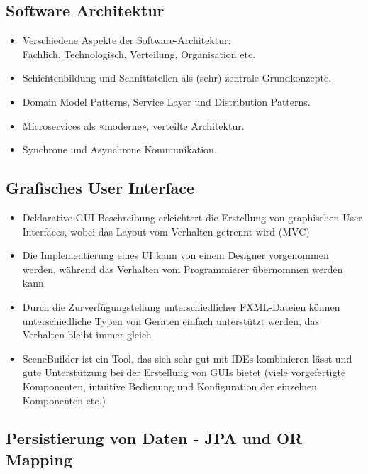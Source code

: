 \documentclass[a4paper]{article}
\begin{document}
		\newpage
		
		\subsection{Software Architektur}
		
			\begin{itemize}
				\item Verschiedene Aspekte der Software-Architektur:\\
				Fachlich, Technologisch, Verteilung, Organisation etc.
				\item Schichtenbildung und Schnittstellen als (sehr) zentrale Grundkonzepte.
				\item Domain Model Patterns, Service Layer und Distribution Patterns.
				\item Microservices als «moderne», verteilte Architektur.
				\item Synchrone und Asynchrone Kommunikation.
			\end{itemize}
		
		\subsection{Grafisches User Interface}
		
			\begin{itemize}
				\item Deklarative GUI Beschreibung erleichtert die Erstellung von graphischen User Interfaces, wobei das Layout vom Verhalten getrennt wird (MVC)
				\item Die Implementierung eines UI kann von einem Designer vorgenommen werden, während das Verhalten vom Programmierer übernommen werden kann
				\item Durch die Zurverfügungstellung unterschiedlicher FXML-Dateien können unterschiedliche Typen von Geräten einfach unterstützt werden, das Verhalten bleibt immer gleich
				\item SceneBuilder ist ein Tool, das sich sehr gut mit IDEs kombinieren lässt und gute Unterstützung bei der Erstellung von GUIs bietet (viele vorgefertigte Komponenten, intuitive Bedienung und Konfiguration der einzelnen Komponenten etc.)
			\end{itemize}
		
		\subsection{Persistierung von Daten - JPA und OR Mapping}
		
\end{document}

